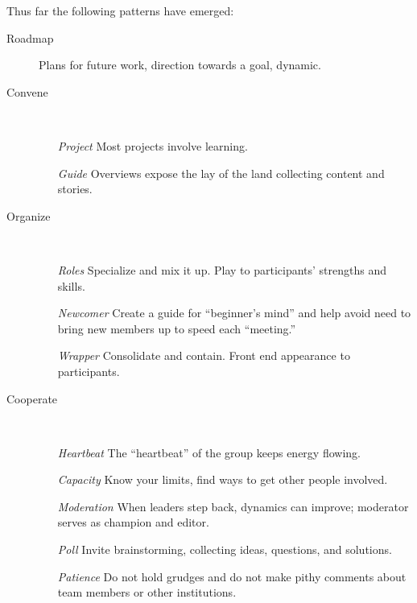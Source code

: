 \documentclass{acm_proc_article-sp}
\begin{document}
Thus far the following patterns have emerged:

\vspace{.2in}
\hspace{.2in}
\begin{minipage}{.4\textwidth}
\begin{description}
\item[Roadmap] Plans for future work, direction towards a goal, dynamic.
\item[Convene] \quad \\[-.1in]
\begin{itemize}
\item[\emph{Project}] Most projects involve learning.
\item[\emph{Guide}] Overviews expose the lay of the land collecting content
  and stories.
\end{itemize}
\end{description}
\end{minipage}

\hspace{.2in}
\begin{minipage}{.4\textwidth}
\begin{description}
\item[Organize] \quad \\[-.1in]
\begin{itemize}
\item[\emph{Roles}] Specialize and mix it up. Play to participants' strengths and skills.
\item[\emph{Newcomer}] Create a guide for ``beginner's mind'' and help avoid
  need to bring new members up to speed each ``meeting.''
\item[\emph{Wrapper}] Consolidate and contain. Front end appearance to
  participants.
\end{itemize}
\end{description}
\end{minipage}

\hspace{.2in}
\begin{minipage}{.4\textwidth}
\begin{description}
\item[Cooperate] \quad \\[-.1in]
\begin{itemize}
\item[\emph{Heartbeat}] The ``heartbeat'' of the group keeps energy flowing.
\item[\emph{Capacity}] Know your limits, find ways to get other people
  involved.
\item[\emph{Moderation}] When leaders step back, dynamics can improve;
  moderator serves as champion and editor.
\item[\emph{Poll}] Invite brainstorming, collecting ideas, questions, and
  solutions.
\item[\emph{Patience}] Do not hold grudges and do not make pithy comments
  about team members or other institutions.
\end{itemize}
\end{description}
\end{minipage}
\end{document}
